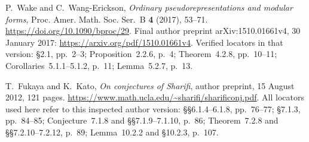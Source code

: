 P.~Wake and C.~Wang-Erickson,
\emph{Ordinary pseudorepresentations and modular forms},
Proc. Amer. Math. Soc. Ser.~B \textbf{4} (2017), 53--71.
\url{https://doi.org/10.1090/bproc/29}.
Final author preprint arXiv:1510.01661v4, 30 January 2017:
\url{https://arxiv.org/pdf/1510.01661v4}.
Verified locators in that version: \S2.1, pp.~2--3;
Proposition~2.2.6, p.~4; Theorem~4.2.8, pp.~10--11;
Corollaries~5.1.1--5.1.2, p.~11; Lemma~5.2.7, p.~13.

T.~Fukaya and K.~Kato,
\emph{On conjectures of Sharifi}, author preprint,
15 August 2012, 121 pages.
\url{https://www.math.ucla.edu/~sharifi/sharificonj.pdf}.
All locators used here refer to this inspected author version:
\S\S6.1.4--6.1.8, pp.~76--77;
\S7.1.3, pp.~84--85;
Conjecture~7.1.8 and \S\S7.1.9--7.1.10, p.~86;
Theorem~7.2.8 and \S\S7.2.10--7.2.12, p.~89;
Lemma~10.2.2 and \S10.2.3, p.~107.
